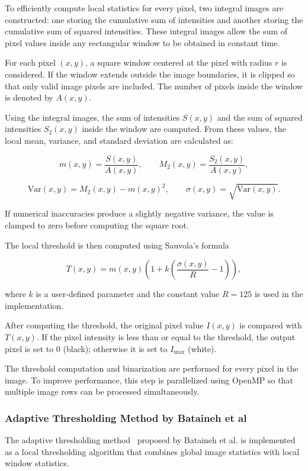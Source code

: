 To efficiently compute local statistics for every pixel, two integral
images are constructed: one storing the cumulative sum of intensities
and another storing the cumulative sum of squared intensities. These
integral images allow the sum of pixel values inside any rectangular
window to be obtained in constant time.

For each pixel $(x,y)$, a square window centered at the pixel with
radius $r$ is considered. If the window extends outside the image
boundaries, it is clipped so that only valid image pixels are included.
The number of pixels inside the window is denoted by $A(x,y)$.

Using the integral images, the sum of intensities $S(x,y)$ and the sum
of squared intensities $S_2(x,y)$ inside the window are computed. From
these values, the local mean, variance, and standard deviation are
calculated as:

\[
m(x,y) = \frac{S(x,y)}{A(x,y)}, \qquad
M_2(x,y) = \frac{S_2(x,y)}{A(x,y)},
\]

\[
\mathrm{Var}(x,y) = M_2(x,y) - m(x,y)^2, \qquad
\sigma(x,y) = \sqrt{\mathrm{Var}(x,y)}.
\]

If numerical inaccuracies produce a slightly negative variance, the
value is clamped to zero before computing the square root.

The local threshold is then computed using Sauvola's formula

\[
T(x,y) = m(x,y)\left(1 + k\left(\frac{\sigma(x,y)}{R} - 1\right)\right),
\]

where $k$ is a user-defined parameter and the constant value
$R = 125$ is used in the implementation.

After computing the threshold, the original pixel value $I(x,y)$ is
compared with $T(x,y)$. If the pixel intensity is less than or equal
to the threshold, the output pixel is set to $0$ (black); otherwise it
is set to $I_{\text{max}}$ (white).

The threshold computation and binarization are performed for every
pixel in the image. To improve performance, this step is parallelized
using OpenMP so that multiple image rows can be processed
simultaneously.

\subsubsection{Adaptive Thresholding Method by Bataineh et al}

The adaptive thresholding method~\cite{Bataineh2011} proposed by Bataineh et al. is implemented as a local thresholding algorithm
that combines global image statistics with local window statistics.

